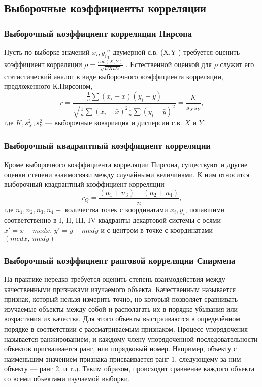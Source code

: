 \documentclass[12pt]{article}
\begin{document}
	\subsection{Выборочные коэффициенты корреляции}
	\subsubsection{Выборочный коэффициент корреляции Пирсона}
	Пусть по выборке значений ${x_{i},y_{i}}^{n}_{1}$ двумерной с.в. (X,Y ) требуется оценить коэффициент корреляции $\rho = \frac{cov(X,Y)}{\sqrt{DXDY}}$ . Естественной оценкой для $\rho$ служит его статистический аналог в виде выборочного коэффициента корреляции, предложенного К.Пирсоном, —
	\begin{equation}
		r = \frac{
			\frac{1}{n}\sum{(x_{i} - \bar{x})(y_{i}-\bar{y})}
		}{
			\sqrt{\frac{1}{n}\sum{(x_{i} - \bar{x})^{2}}\frac{1}{n}\sum{(y_{i} - \bar{y})^{2}}}
		}=\frac{K}{s_{X}s_{Y}},
		\label{r}
	\end{equation}
	где $K,s^{2}_{X},s^{2}_{Y}$ — выборочные ковариация и дисперсии с.в. $X$ и $Y$.
	
	
	\subsubsection{Выборочный квадрантный коэффициент корреляции}
	Кроме выборочного коэффициента корреляции Пирсона, существуют и другие оценки степени взаимосвязи между случайными величинами. К ним относится выборочный квадрантный коэффициент корреляции
	\begin{equation}
		r_{Q} = \frac{(n_{1} + n_{3}) - (n_{2} + n_{4})}{n},
		\label{rQ}
	\end{equation}
	где $n_1, n_2, n_3, n_4 - $ количества точек с координатами $x_i, y_i$, попавшими соответственно в I, II, III, IV квадранты декартовой системы с осями $x'=x-med x$, $y'=y-med y$ и с центром в точке с координатами $(med x,~med y)$
	
	
	
	\subsubsection{Выборочный коэффициент ранговой корреляции Спирмена}
	На практике нередко требуется оценить степень взаимодействия между качественными признаками изучаемого объекта. Качественным называется признак, который нельзя измерить точно, но который позволяет сравнивать изучаемые объекты между собой и располагать их в порядке убывания или возрастания их качества. Для этого объекты выстраиваются в определённом порядке в соответствии с рассматриваемым признаком. Процесс упорядочения называется ранжированием, и каждому члену упорядоченной последовательности объектов присваивается ранг, или порядковый номер. Например, объекту с наименьшим значением признака присваивается ранг 1, следующему за ним объекту — ранг 2, и т.д. Таким образом, происходит сравнение каждого объекта со всеми объектами изучаемой выборки.
	
\end{document}
